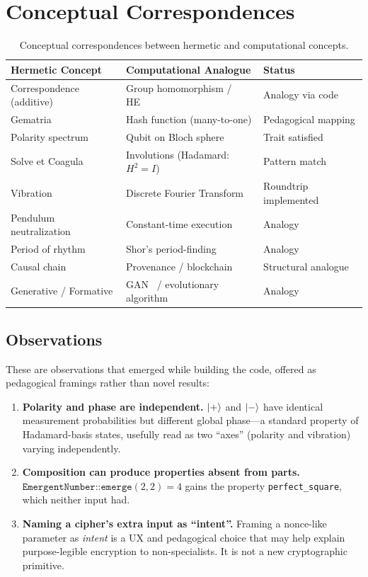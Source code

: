 \documentclass[sigplan,anonymous=false]{acmart}
\begin{document}
\section{Conceptual Correspondences}

\begin{table}[t]
\centering
\begin{tabular}{@{}lll@{}}
\toprule
\textbf{Hermetic Concept} & \textbf{Computational Analogue} & \textbf{Status} \\
\midrule
Correspondence (additive)  & Group homomorphism / HE~\cite{gentry}        & Analogy via code \\
Gematria                   & Hash function (many-to-one)                    & Pedagogical mapping \\
Polarity spectrum          & Qubit on Bloch sphere~\cite{bloch}             & Trait satisfied \\
Solve et Coagula           & Involutions (Hadamard: $H^2 = I$)              & Pattern match \\
Vibration                  & Discrete Fourier Transform                     & Roundtrip implemented \\
Pendulum neutralization    & Constant-time execution                        & Analogy \\
Period of rhythm           & Shor's period-finding~\cite{shor}              & Analogy \\
Causal chain               & Provenance / blockchain~\cite{nakamoto}        & Structural analogue \\
Generative / Formative     & GAN~\cite{gan} / evolutionary algorithm        & Analogy \\
\bottomrule
\end{tabular}
\caption{Conceptual correspondences between hermetic and computational concepts.}
\label{tab:correspondences}
\end{table}

\subsection{Observations}

These are observations that emerged while building the code, offered as pedagogical framings rather than novel results:

\begin{enumerate}[nosep]
  \item \textbf{Polarity and phase are independent.} $\ket{+}$ and $\ket{-}$ have identical measurement probabilities but different global phase---a standard property of Hadamard-basis states, usefully read as two ``axes'' (polarity and vibration) varying independently.
  \item \textbf{Composition can produce properties absent from parts.} $\texttt{EmergentNumber::emerge}(2, 2) = 4$ gains the property \texttt{perfect\_square}, which neither input had.
  \item \textbf{Naming a cipher's extra input as ``intent''.} Framing a nonce-like parameter as \emph{intent} is a UX and pedagogical choice that may help explain purpose-legible encryption to non-specialists. It is not a new cryptographic primitive.
\end{enumerate}
\end{document}

